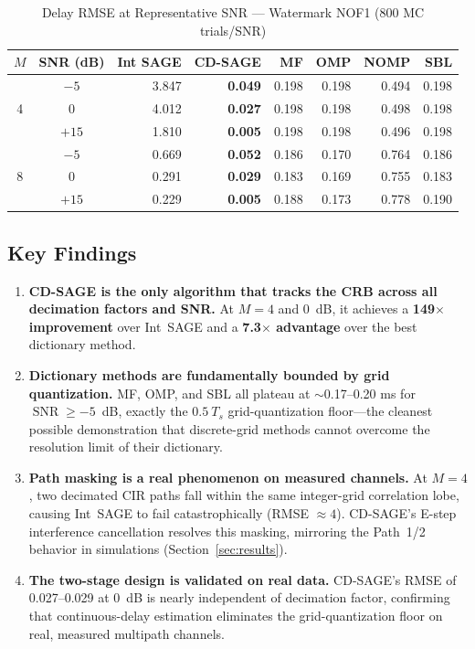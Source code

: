 \documentclass[a4paper,fleqn]{cas-dc}
\DeclareMathOperator{\SNR}{SNR}
\begin{document}
\begin{table}[cols=8,pos=h]
\centering
\caption{Delay RMSE at Representative SNR --- Watermark NOF1 (800 MC trials/SNR)}
\label{tab:wm}
\footnotesize
\begin{tabular}{@{}ccrrrrrr@{}}
\toprule
$M$ & SNR (dB) & Int SAGE & \textbf{CD-SAGE} & MF & OMP & NOMP & SBL \\
\midrule
\multirow{3}{*}{4} & $-5$  & 3.847 & \textbf{0.049} & 0.198 & 0.198 & 0.494 & 0.198 \\
                    & $0$   & 4.012 & \textbf{0.027} & 0.198 & 0.198 & 0.498 & 0.198 \\
                    & $+15$ & 1.810 & \textbf{0.005} & 0.198 & 0.198 & 0.496 & 0.198 \\
\midrule
\multirow{3}{*}{8} & $-5$  & 0.669 & \textbf{0.052} & 0.186 & 0.170 & 0.764 & 0.186 \\
                    & $0$   & 0.291 & \textbf{0.029} & 0.183 & 0.169 & 0.755 & 0.183 \\
                    & $+15$ & 0.229 & \textbf{0.005} & 0.188 & 0.173 & 0.778 & 0.190 \\
\bottomrule
\end{tabular}
\end{table}

\subsection{Key Findings}

\begin{enumerate}
\item \textbf{CD-SAGE is the only algorithm that tracks the CRB across all decimation factors and SNR.} At $M=4$ and \SI{0}{dB}, it achieves a \textbf{149$\times$ improvement} over Int~SAGE and a \textbf{7.3$\times$ advantage} over the best dictionary method.
\item \textbf{Dictionary methods are fundamentally bounded by grid quantization.} MF, OMP, and SBL all plateau at $\sim$0.17--0.20 ms for $\SNR \ge -5$~dB, exactly the $0.5\ T_s$ grid-quantization floor---the cleanest possible demonstration that discrete-grid methods cannot overcome the resolution limit of their dictionary.
\item \textbf{Path masking is a real phenomenon on measured channels.} At $M=4$, two decimated CIR paths fall within the same integer-grid correlation lobe, causing Int~SAGE to fail catastrophically (RMSE $\approx 4$). CD-SAGE's E-step interference cancellation resolves this masking, mirroring the Path~1/2 behavior in simulations (Section~\ref{sec:results}).
\item \textbf{The two-stage design is validated on real data.} CD-SAGE's RMSE of 0.027--0.029 at \SI{0}{dB} is nearly independent of decimation factor, confirming that continuous-delay estimation eliminates the grid-quantization floor on real, measured multipath channels.
\end{enumerate}
\end{document}
